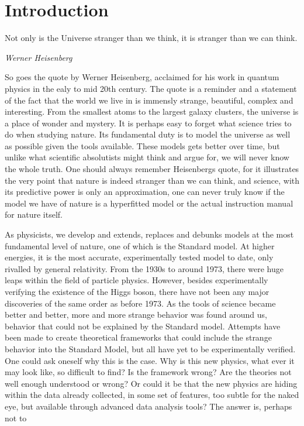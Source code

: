 \chapter*{Introduction}

\epigraph{Not only is the Universe stranger than we think, it is stranger than we can think.}{\textit{Werner Heisenberg}}
So goes the quote by Werner Heisenberg, acclaimed for his work in quantum physics in the ealy to mid 
20th century. The quote is a reminder and a statement of the fact that the world we live in is immensly 
strange, beautiful, complex and interesting. From the smallest atoms to the largest galaxy clusters, 
the universe is a place of wonder and mystery. It is perhaps easy to forget what science tries to do
when studying nature. Its fundamental duty is to model the universe as well as possible given the tools 
available. These models gets better over time, but unlike what scientific absolutists might think and 
argue for, we will never know the whole truth. One should always remember Heisenbergs quote, for it
illustrates the very point that nature is indeed stranger than we can think, and science, with its 
predictive power is only an approximation, one can never truly know if the model we have of nature is 
a hyperfitted model or the actual instruction manual for nature itself. \par As physicists, we develop 
and extends, replaces and debunks models at the most fundamental level of nature, one of which is
the Standard model. At higher energies, it is the most accurate, experimentally tested model to date,
only rivalled by general relativity. From the 1930s to around 1973, there were huge leaps within the field
of particle physics. However, besides experimentally verifying the existence of the Higgs boson,
there have not been any major discoveries of the same order as before 1973. As the tools of science became 
better and better, more and more strange behavior was found around us, behavior that could not be explained by the 
Standard model. Attempts have been made to create theoretical frameworks that could include the strange behavior 
into the Standard Model, but all have yet to be experimentally verified. One could ask oneself why 
this is the case. Why is this new physics, what ever it may look like, so difficult to find? 
Is the framework wrong? Are the theories not well enough understood or wrong? Or could it be that
the new physics are hiding within the data already collected, in some set of features, too subtle for
the naked eye, but available through advanced data analysis tools? The answer is, perhaps not to 
